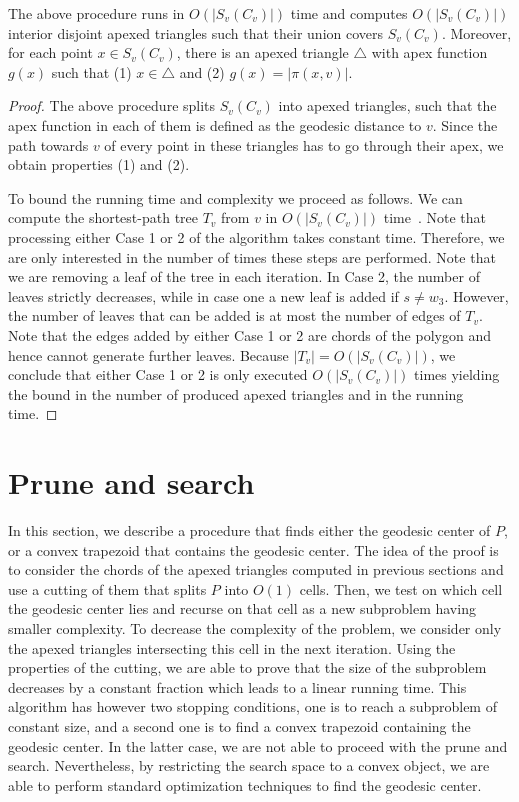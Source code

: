 \documentclass[a4paper,UKenglish]{lipics}
\newcommand{\fn}[2]{\ensuremath{S_{\scriptscriptstyle #1}(#2)}}
\newcommand{\g}[2]{\ensuremath{|\pi(#1, #2)|}}
\begin{document}
\begin{lemma}\label{lemma:Triangles inside funnels}
The above procedure runs in $O(|\fn{v}{C_v}|)$ time and computes $O(|\fn{v}{C_v}|)$ interior disjoint apexed triangles such that their union covers $\fn{v}{C_v}$. Moreover, for each point $x\in \fn{v}{C_v}$, there is an apexed triangle $\triangle$ with apex function $g(x)$ such that (1) $x\in \triangle$ and (2) $g(x) = \g{x}{v}$.
\end{lemma}
\begin{proof}
The above procedure splits $\fn{v}{C_v}$ into apexed triangles, such that the apex function in each of them is defined as the geodesic distance to $v$. Since the path towards $v$ of every point in these triangles has to go through their apex, we obtain properties (1) and (2).

To bound the running time and complexity we proceed as follows. 
We can compute the shortest-path tree $T_v$ from $v$ in $O(|\fn{v}{C_v}|)$ time~\cite{guibasShortestPathTree}.
Note that processing either Case 1 or 2 of the algorithm takes constant time. Therefore, we are only interested in the number of times these steps are performed. Note that we are removing a leaf of the tree in each iteration. In Case 2, the number of leaves strictly decreases, while in case one a new leaf is added if $s\neq w_3$. However, the number of leaves that can be added is at most the number of edges of $T_v$. Note that the edges added by either Case 1 or 2 are chords of the polygon and hence cannot generate further leaves. Because $|T_v| = O(|\fn{v}{C_v}|)$, we conclude that either Case 1 or 2 is only executed $O(|\fn{v}{C_v}|)$ times yielding the bound in the number of produced apexed triangles and in the running time.
\end{proof}

\section{Prune and search}\label{section:Prune and search}

In this section, we describe a procedure that finds either the geodesic center of $P$, or a convex trapezoid that contains the geodesic center.
The idea of the proof is to consider the chords of the apexed triangles computed in previous sections and use a cutting of them that splits $P$ into $O(1)$ cells. Then, we test on which cell the geodesic center lies and recurse on that cell as a new subproblem having smaller complexity. To decrease the complexity of the problem, we consider only the apexed triangles intersecting this cell in the next iteration. Using the properties of the cutting, we are able to prove that the size of the subproblem decreases by a constant fraction which leads to a linear running time. This algorithm has however two stopping conditions, one is to reach a subproblem of constant size, and a second one is to find a convex trapezoid containing the geodesic center. In the latter case, we are not able to proceed with the prune and search. Nevertheless, by restricting the search space to a convex object, we are able to perform standard optimization techniques to find the geodesic center.
\end{document}
